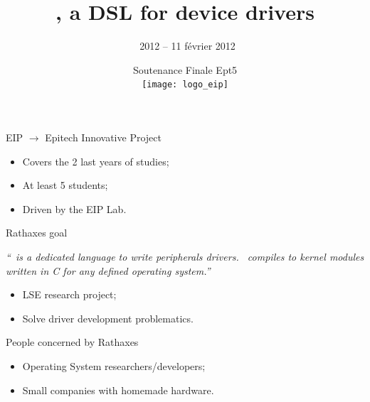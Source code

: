 \documentclass[xcolor={usenames,svgnames}]{beamer}
\title{\rtx, a DSL for device drivers}
\date[Soutenance Finale Ept5]{Soutenance Finale Ept5 \\ \vspace{10pt} \texttt{[image: logo\_eip]}}
\author[\rtx\ 2012 -- 11 février 2012]{\rtx\ 2012 -- 11 février 2012 \vspace{-20pt}}
\begin{document}
\begin{frame}
\titlepage
\end{frame}

\begin{frame}{EIP $\rightarrow$ Epitech Innovative Project}
\Large{
\begin{itemize}
\item Covers the 2 last years of studies;
\item At least 5 students;
\item Driven by the EIP Lab.
\end{itemize}
}
\end{frame}

\begin{frame}{Rathaxes goal}
\Large{
\textrm{\itshape{``\rtx\ is a \textcolor{rathaxesred}{dedicated language} to
\textcolor{rathaxesred}{write peripherals drivers}. \rtx\ compiles to kernel
modules written in C for any defined operating system.''}}
\vspace{2em}
\begin{itemize}
\item LSE research project;
\item Solve driver development problematics.
\end{itemize}
}
\end{frame}

\begin{frame}{People concerned by Rathaxes}
\Large{
\begin{itemize}
\item Operating System researchers/developers;
\item Small companies with homemade hardware.
\end{itemize}
}
\end{frame}
\end{document}
